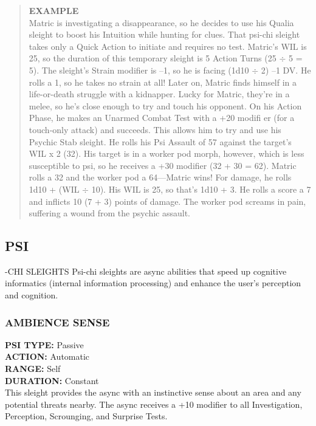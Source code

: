 \begin{quotation}
\textbf{EXAMPLE}
\\
Matric is investigating a disappearance, so he
decides to use his Qualia sleight to boost his
Intuition while hunting for clues. That psi-chi
sleight takes only a Quick Action to initiate and
requires no test. Matric’s WIL is 25, so the duration
of this temporary sleight is 5 Action Turns
(25 $\div$ 5 = 5). The sleight’s Strain modifier is –1,
so he is facing (1d10 $\div$ 2) –1 DV. He rolls a 1, so
he takes no strain at all!
Later on, Matric finds himself in a life-or-death
struggle with a kidnapper. Lucky for Matric,
they’re in a melee, so he’s close enough to try
and touch his opponent. On his Action Phase, he
makes an Unarmed Combat Test with a +20 modifi
er (for a touch-only attack) and succeeds. This
allows him to try and use his Psychic Stab sleight.
He rolls his Psi Assault of 57 against the target’s
WIL x 2 (32). His target is in a worker pod morph,
however, which is less susceptible to psi, so he
receives a +30 modifier (32 + 30 = 62). Matric
rolls a 32 and the worker pod a 64—Matric wins!
For damage, he rolls 1d10 + (WIL $\div$ 10). His WIL
is 25, so that’s 1d10 + 3. He rolls a score a 7 and
inflicts 10 (7 + 3) points of damage. The worker
pod screams in pain, suffering a wound from the
psychic assault.

\end{quotation}



\subsection{PSI}-CHI SLEIGHTS
Psi-chi sleights are async abilities that speed up cognitive
informatics (internal information processing) and
enhance the user’s perception and cognition.

\subsubsection{AMBIENCE SENSE}
\textbf{PSI TYPE:} Passive \\ 
\textbf{ACTION:} Automatic \\ 
\textbf{RANGE:} Self \\ 
\textbf{DURATION:} Constant \\
This sleight provides the async with an instinctive
sense about an area and any potential threats nearby.
The async receives a +10 modifier to all Investigation,
Perception, Scrounging, and Surprise Tests.

